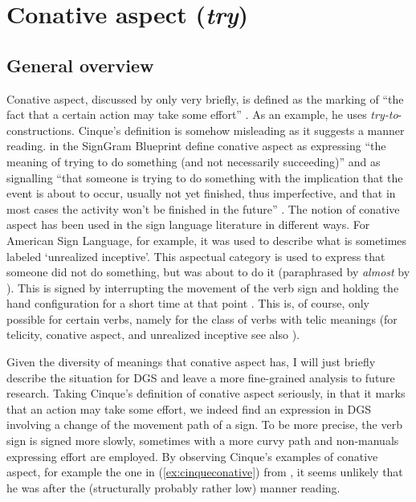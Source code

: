 \largerpage
\section{Conative aspect (\textit{try})}\label{conative}
\subsection{General overview}
Conative aspect, discussed by \citet{cinque1999adverbs, cinque2006restructuring} only very briefly, is defined as the marking of ``the fact that a certain action may take some effort'' \citep[105]{cinque1999adverbs}. As an example, he uses \textit{try-to}-constructions. Cinque's definition is somehow misleading as it suggests a manner reading. \citet[568]{signgram2017} in the SignGram Blueprint define conative aspect as expressing ``the meaning of trying to do something (and not necessarily succeeding)'' and as signalling ``that someone is trying to do something with the implication that the event is about to occur, usually not yet finished, thus imperfective, and that in most cases the activity won't be finished in the future'' \citep[225--226]{signgram2017}. The notion of conative aspect has been used in the sign language literature in different ways. For American Sign Language, for example, it was used to describe what is sometimes labeled `unrealized inceptive'. This aspectual category is used to express that someone did not do something, but was about to do it (paraphrased by \textit{almost} by \citealt{wilbur2010semantics}). This is signed by interrupting the movement of the verb sign and holding the hand configuration for a short time at that point \citep{liddell1984unrealized, rathmann2005event}. This is, of course, only possible for certain verbs, namely for the class of verbs with telic meanings (for telicity, conative aspect, and unrealized inceptive see also \citealt{wilbur1987american, brentari1998prosodic, wilbur2008complex, wilbur2010semantics}).

Given the diversity of meanings that conative aspect has, I will just briefly describe the situation for DGS and leave a more fine-grained analysis to future research. Taking Cinque's definition of conative aspect seriously, in that it marks that an action may take some effort, we indeed find an expression in DGS involving a change of the movement path of a sign. To be more precise, the verb sign is signed more slowly, sometimes with a more curvy path and non-manuals expressing effort are employed. By observing Cinque's examples of conative aspect, for example the one in (\ref{ex:cinqueconative}) from \citet[143]{cinque2001restructuring}, it seems unlikely that he was after the (structurally probably rather low) manner reading.

